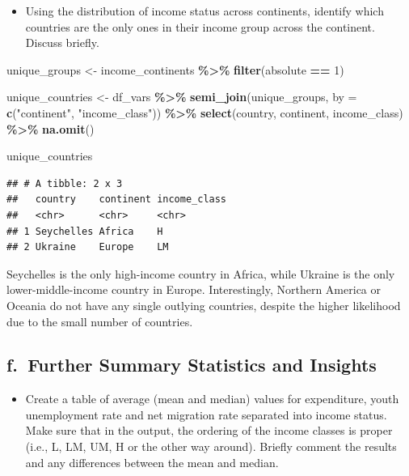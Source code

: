\documentclass[
]{article}
\newenvironment{Shaded}{\begin{snugshade}}{\end{snugshade}}
\newcommand{\AttributeTok}[1]{\textcolor[rgb]{0.13,0.29,0.53}{#1}}
\newcommand{\DecValTok}[1]{\textcolor[rgb]{0.00,0.00,0.81}{#1}}
\newcommand{\FunctionTok}[1]{\textcolor[rgb]{0.13,0.29,0.53}{\textbf{#1}}}
\newcommand{\NormalTok}[1]{#1}
\newcommand{\OtherTok}[1]{\textcolor[rgb]{0.56,0.35,0.01}{#1}}
\newcommand{\SpecialCharTok}[1]{\textcolor[rgb]{0.81,0.36,0.00}{\textbf{#1}}}
\newcommand{\StringTok}[1]{\textcolor[rgb]{0.31,0.60,0.02}{#1}}
\providecommand{\tightlist}{%
  \setlength{\itemsep}{0pt}\setlength{\parskip}{0pt}}
\begin{document}
\begin{itemize}
\tightlist
\item
  Using the distribution of income status across continents, identify
  which countries are the only ones in their income group across the
  continent. Discuss briefly.
\end{itemize}

\begin{Shaded}
\begin{Highlighting}[]
\NormalTok{unique\_groups }\OtherTok{\textless{}{-}}\NormalTok{ income\_continents }\SpecialCharTok{\%\textgreater{}\%}
  \FunctionTok{filter}\NormalTok{(absolute }\SpecialCharTok{==} \DecValTok{1}\NormalTok{)}

\NormalTok{unique\_countries }\OtherTok{\textless{}{-}}\NormalTok{ df\_vars }\SpecialCharTok{\%\textgreater{}\%}
  \FunctionTok{semi\_join}\NormalTok{(unique\_groups, }\AttributeTok{by =} \FunctionTok{c}\NormalTok{(}\StringTok{"continent"}\NormalTok{, }\StringTok{"income\_class"}\NormalTok{)) }\SpecialCharTok{\%\textgreater{}\%}
  \FunctionTok{select}\NormalTok{(country, continent, income\_class) }\SpecialCharTok{\%\textgreater{}\%}
  \FunctionTok{na.omit}\NormalTok{()}

\NormalTok{unique\_countries}
\end{Highlighting}
\end{Shaded}

\begin{verbatim}
## # A tibble: 2 x 3
##   country    continent income_class
##   <chr>      <chr>     <chr>       
## 1 Seychelles Africa    H           
## 2 Ukraine    Europe    LM
\end{verbatim}

Seychelles is the only high-income country in Africa, while Ukraine is
the only lower-middle-income country in Europe. Interestingly, Northern
America or Oceania do not have any single outlying countries, despite
the higher likelihood due to the small number of countries.

\subsection{f.~Further Summary Statistics and
Insights}\label{f.-further-summary-statistics-and-insights}

\begin{itemize}
\tightlist
\item
  Create a table of average (mean and median) values for expenditure,
  youth unemployment rate and net migration rate separated into income
  status. Make sure that in the output, the ordering of the income
  classes is proper (i.e., L, LM, UM, H or the other way around).
  Briefly comment the results and any differences between the mean and
  median.
\end{itemize}
\end{document}
